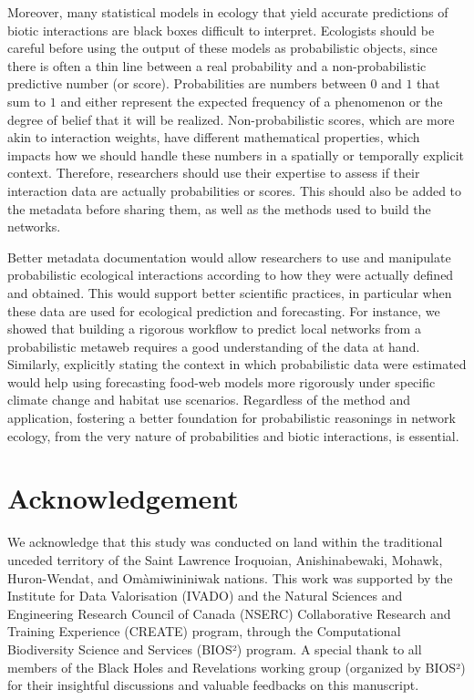 \documentclass[10pt,oneside]{article}
\begin{document}
Moreover, many statistical models in ecology that yield accurate
predictions of biotic interactions are black boxes difficult to
interpret. Ecologists should be careful before using the output of these
models as probabilistic objects, since there is often a thin line
between a real probability and a non-probabilistic predictive number (or
score). Probabilities are numbers between \(0\) and \(1\) that sum to
\(1\) and either represent the expected frequency of a phenomenon or the
degree of belief that it will be realized. Non-probabilistic scores,
which are more akin to interaction weights, have different mathematical
properties, which impacts how we should handle these numbers in a
spatially or temporally explicit context. Therefore, researchers should
use their expertise to assess if their interaction data are actually
probabilities or scores. This should also be added to the metadata
before sharing them, as well as the methods used to build the networks.

Better metadata documentation would allow researchers to use and
manipulate probabilistic ecological interactions according to how they
were actually defined and obtained. This would support better scientific
practices, in particular when these data are used for ecological
prediction and forecasting. For instance, we showed that building a
rigorous workflow to predict local networks from a probabilistic metaweb
requires a good understanding of the data at hand. Similarly, explicitly
stating the context in which probabilistic data were estimated would
help using forecasting food-web models more rigorously under specific
climate change and habitat use scenarios. Regardless of the method and
application, fostering a better foundation for probabilistic reasonings
in network ecology, from the very nature of probabilities and biotic
interactions, is essential.

\hypertarget{acknowledgement}{%
\section{Acknowledgement}\label{acknowledgement}}

We acknowledge that this study was conducted on land within the
traditional unceded territory of the Saint Lawrence Iroquoian,
Anishinabewaki, Mohawk, Huron-Wendat, and Omàmiwininiwak nations. This
work was supported by the Institute for Data Valorisation (IVADO) and
the Natural Sciences and Engineering Research Council of Canada (NSERC)
Collaborative Research and Training Experience (CREATE) program, through
the Computational Biodiversity Science and Services (BIOS²) program. A
special thank to all members of the Black Holes and Revelations working
group (organized by BIOS²) for their insightful discussions and valuable
feedbacks on this manuscript.
\end{document}
